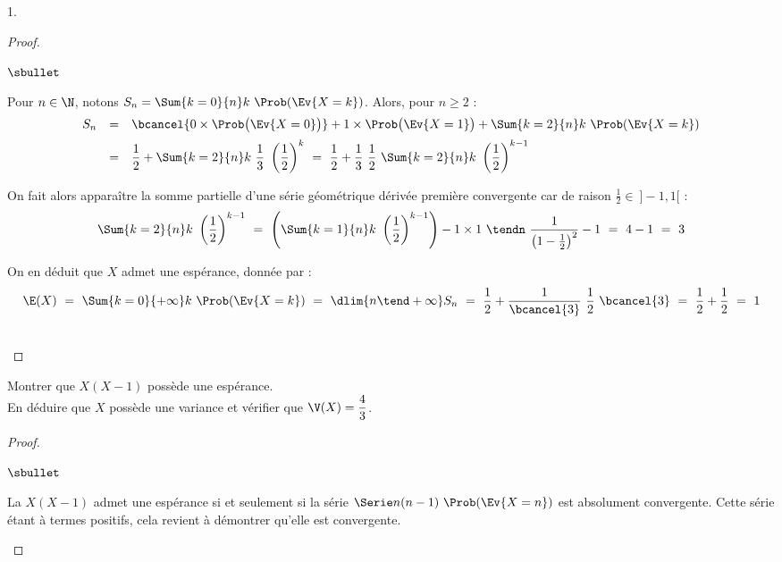 \documentclass[11pt]{article}%
\begin{document}
\begin{noliste}{1.}
\begin{proof}
\begin{noliste}{$\sbullet$}
    \item Pour $n \in \N$, notons $S_n = \Sum{k = 0}{n} k \
      \Prob(\Ev{X = k})$. Alors, pour $n \geq 2$ :
      \[
      \begin{array}{rcl}
        S_n & = & \bcancel{0 \times \Prob\big( \Ev{X = 0}\big)} + 1
        \times \Prob\big( \Ev{X = 1}\big) + \Sum{k = 2}{n} k \
        \Prob(\Ev{X = k}) 
        \\[.2cm]
        & = & \dfrac{1}{2} + \Sum{k = 2}{n} k \
        \dfrac{1}{3} \ \left( \dfrac{1}{2} \right)^k
        \ = \ \dfrac{1}{2} + \dfrac{1}{3} \ \dfrac{1}{2} \ \Sum{k =
          2}{n} k \ \left( \dfrac{1}{2} \right)^{k-1}
      \end{array}
      \]




    \item On fait alors apparaître la somme partielle d'une série
      géométrique dérivée première convergente car de raison
      $\frac{1}{2} \in \ ]-1,1[$ :
      \[
      \Sum{k = 2}{n} k \ \left( \dfrac{1}{2} \right)^{k-1} \ = \
      \left( \Sum{k = 1}{n} k \ \left( \dfrac{1}{2} \right)^{k-1}
      \right) - 1 \times 1 \ \tendn \ \dfrac{1}{\left( 1 - \frac{1}{2}
        \right)^2} - 1 \ = \ 4 - 1 \ = \ 3
      \]

    \item On en déduit que $X$ admet une espérance, donnée par :
      \[
      \E(X) \ = \ \Sum{k=0}{+\infty} k \ \Prob(\Ev{X = k}) \ = \
      \dlim{n \tend +\infty} S_n \ = \ \dfrac{1}{2} +
      \dfrac{1}{\bcancel{3}} \ \dfrac{1}{2} \ \bcancel{3} \ = \
      \dfrac{1}{2} + \dfrac{1}{2} \ = \ 1
      \]
    \end{noliste}
    \conc{$\E(X) = 1$}~\\[-1.2cm]
  \end{proof}

\item Montrer que $X (X-1)$ possède une espérance. \\
  En déduire que $X$ possède une variance et vérifier que $\V(X) =
  \dfrac{4}{3}$.

  \begin{proof}~%
    \begin{noliste}{$\sbullet$}
    \item La \var $X(X-1)$ admet une espérance si et seulement si la
      série $\Serie n(n-1) \ \Prob(\Ev{X = n})$ est absolument
      convergente. Cette série étant à termes positifs, cela revient à
      démontrer qu'elle est convergente.


\end{noliste}
\end{proof}
\end{noliste}
\end{document}
